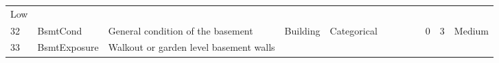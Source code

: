 \documentclass[11pt]{article}
\begin{document}
\begin{longtable}[]{@{}llllllllllll@{}}
\begin{minipage}[t]{0.04\columnwidth}
Low\strut
\end{minipage}\tabularnewline
\begin{minipage}[t]{0.04\columnwidth}\raggedright\strut
32\strut
\end{minipage} & \begin{minipage}[t]{0.04\columnwidth}\raggedright\strut
BsmtCond\strut
\end{minipage} & \begin{minipage}[t]{0.04\columnwidth}\raggedright\strut
General condition of the basement\strut
\end{minipage} & \begin{minipage}[t]{0.04\columnwidth}\raggedright\strut
Building\strut
\end{minipage} & \begin{minipage}[t]{0.04\columnwidth}\raggedright\strut
Categorical\strut
\end{minipage} & \begin{minipage}[t]{0.04\columnwidth}\raggedright\strut
\strut
\end{minipage} & \begin{minipage}[t]{0.04\columnwidth}\raggedright\strut
\strut
\end{minipage} & \begin{minipage}[t]{0.04\columnwidth}\raggedright\strut
\strut
\end{minipage} & \begin{minipage}[t]{0.04\columnwidth}\raggedright\strut
\strut
\end{minipage} & \begin{minipage}[t]{0.04\columnwidth}\raggedright\strut
0\strut
\end{minipage} & \begin{minipage}[t]{0.04\columnwidth}\raggedright\strut
3\strut
\end{minipage} & \begin{minipage}[t]{0.04\columnwidth}\raggedright\strut
Medium\strut
\end{minipage}\tabularnewline
\begin{minipage}[t]{0.04\columnwidth}\raggedright\strut
33\strut
\end{minipage} & \begin{minipage}[t]{0.04\columnwidth}\raggedright\strut
BsmtExposure\strut
\end{minipage} & \begin{minipage}[t]{0.04\columnwidth}\raggedright\strut
Walkout or garden level basement walls\strut
\end{minipage} & \begin{minipage}[t]{0.04\columnwidth}\raggedright\strut

\end{minipage}
\end{longtable}
\end{document}
